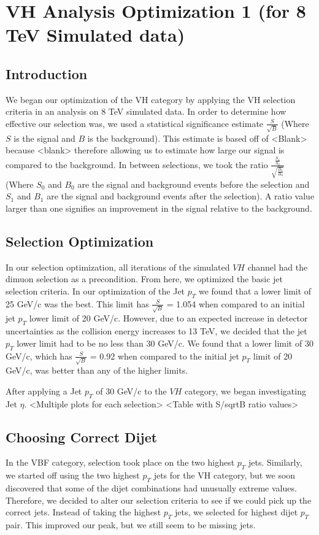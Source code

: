 \documentclass[12pt]{article}
\begin{document}
\section{VH Analysis Optimization 1 (for 8 TeV Simulated data)}
\subsection{Introduction}
We began our optimization of the VH category by applying the VH selection criteria in an analysis on 8 TeV simulated data. In order to determine how effective our selection was, we used a statistical significance estimate $\frac{S}{\sqrt{B}}$ (Where $S$ is the signal and $B$ is the background). This estimate is based off of <Blank> because <blank> therefore allowing us to estimate how large our signal is compared to the background. In between selections, we took the ratio $\frac{\frac{S_{1}}{S_{0}}}{\sqrt{\frac{B_{1}}{B_{0}}}}$ (Where $S_{0}$ and $B_{0}$ are the signal and background events before the selection and $S_{1}$ and $B_{1}$ are the signal and background events after the selection). A ratio value larger than one signifies an improvement in the signal relative to the background.
\subsection{Selection Optimization}
In our selection optimization, all iterations of the simulated $VH$ channel had the dimuon selection as a precondition. From here, we optimized the basic jet selection criteria. In our optimization of the Jet $p_{T}$ we found that a lower limit of 25 GeV/c was the best. This limit has $\frac{S}{\sqrt{B}}$ = 1.054 when compared to an initial jet $p_{T}$ lower limit of 20 GeV/c. However, due to an expected increase in detector uncertainties as the collision energy increases to 13 TeV, we decided that the jet $p_{T}$ lower limit had to be no less than 30 GeV/c. We found that a lower limit of 30 GeV/c, which has $\frac{S}{\sqrt{B}}$ = 0.92 when compared to the initial jet $p_{T}$ limit of 20 GeV/c, was better than any of the higher limits. 

After applying a Jet $p_{T}$ of 30 GeV/c to the $VH$ category, we began investigating Jet $\eta$. 
<Multiple plots for each selection>
<Table with S/sqrtB ratio values>
\subsection{Choosing Correct Dijet}
In the VBF category, selection took place on the two highest $p_{T}$ jets. Similarly, we started off using the two highest $p_{T}$ jets for the VH category, but we soon discovered that some of the dijet combinations had unusually extreme values. Therefore, we decided to alter our selection criteria to see if we could pick up the correct jets. Instead of taking the highest $p_{T}$ jets, we selected for highest dijet $p_{T}$ pair. This improved our peak, but we still seem to be missing jets.
\end{document}
